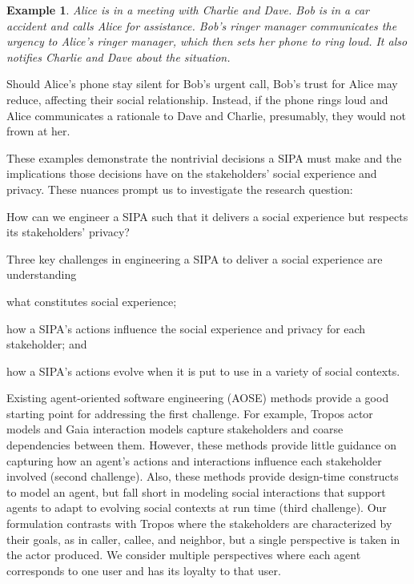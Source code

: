 \documentclass[11pt,          %
               phd,           %
               onehalfspacing %
               ]{ncsuthesis}
\newtheorem{example}{Example}
\begin{document}
\begin{example} \label{ex:ringer-accident} Alice is in a meeting with
Charlie and Dave. Bob is in a car accident and calls Alice for
assistance. Bob's ringer manager communicates the urgency to Alice's
ringer manager, which then sets her phone to ring loud. It also notifies
Charlie and Dave about the situation. \end{example}

Should Alice's phone stay silent for Bob's urgent call, Bob's trust for
Alice may reduce, affecting their social relationship. Instead, if the
phone rings loud and Alice communicates a rationale to Dave and Charlie,
presumably, they would not frown at her.

These examples demonstrate the nontrivial decisions a SIPA must make and
the implications those decisions have on the stakeholders' social
experience and privacy. These nuances prompt us to investigate the
research question:

\begin{description}[leftmargin=1em] \item[RQ.] How can we engineer a
SIPA such that it delivers a social experience but respects its
stakeholders' privacy? \end{description}

%
Three key challenges in engineering a SIPA to deliver a social experience are understanding
\begin{enumerate*}[label=(\arabic*)]
\item what constitutes social experience;
\item how a SIPA's actions influence the social experience and privacy for each stakeholder; and
\item how a SIPA's actions evolve when it is put to use in a 
variety of social contexts.
\end{enumerate*}

Existing agent-oriented software engineering (AOSE) methods provide a
good starting point for addressing the first challenge. For example,
Tropos \citep{Bresciani-JAAMAS04-Tropos} actor models and Gaia
\citep{Wooldridge-2000-Gaia} interaction models capture stakeholders and
coarse dependencies between them. However, these methods provide little
guidance on capturing how an agent's actions and interactions influence
each stakeholder involved (second challenge). Also, these methods
provide design-time constructs to model an agent, but fall short in
modeling social interactions that support agents to adapt to evolving
social contexts at run time (third challenge). Our formulation contrasts
with Tropos where the stakeholders are characterized by their goals, as
in caller, callee, and neighbor, but a single perspective is taken in
the actor produced. We consider multiple perspectives where each agent
corresponds to one user and has its loyalty to that user.
\end{document}

